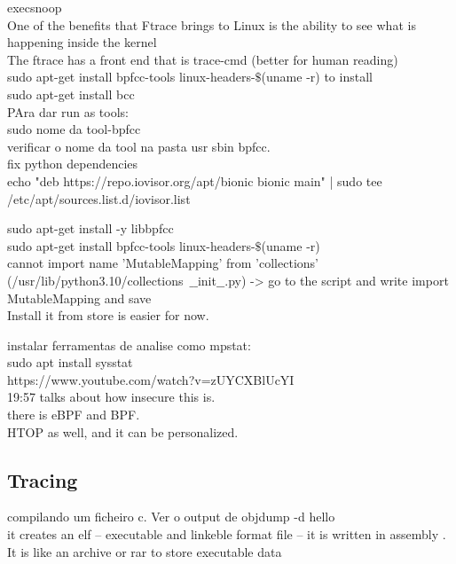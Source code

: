 \documentclass[11pt, a4paper, oneside]{article}
\theoremstyle{definition}
\begin{document}
execsnoop\\

One of the benefits that Ftrace brings to Linux is the ability to see what is happening inside the kernel\\
The ftrace has a front end that is trace-cmd (better for human reading)\\
sudo apt-get install bpfcc-tools linux-headers-$\$$(uname -r) to install\\
sudo apt-get install bcc\\


PAra dar run as tools:\\
sudo nome da tool-bpfcc\\

verificar o nome da tool na pasta usr sbin bpfcc.\\

fix python dependencies\\

echo "deb https://repo.iovisor.org/apt/bionic bionic main" | sudo tee /etc/apt/sources.list.d/iovisor.list

sudo apt-get install -y libbpfcc\\

sudo apt-get install bpfcc-tools linux-headers-$\$$(uname -r)\\

cannot import name 'MutableMapping' from 'collections' (/usr/lib/python3.10/collections\ $\_\_$init$\_\_$.py) -> go to the script and write import MutableMapping and save\\

Install it from store is easier for now. 

instalar ferramentas de analise como mpstat:\\
sudo apt install sysstat\\

https://www.youtube.com/watch?v=zUYCXBlUcYI\\
19:57 talks about how insecure this is.\\
there is eBPF and BPF.\\

HTOP as well, and it can be personalized.\\

\subsection{Tracing}
compilando um ficheiro c. Ver o output de objdump -d hello\\
it creates an elf -- executable and linkeble format file -- it is written in assembly . It is like an archive or rar to store executable data
\end{document}
